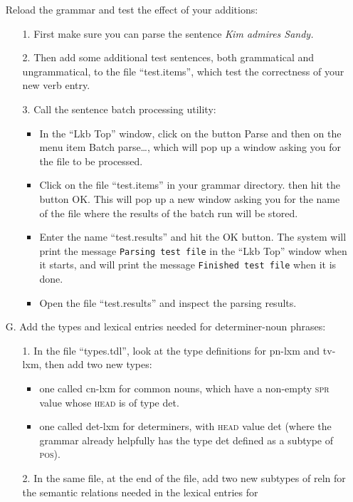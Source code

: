 \documentclass[10pt]{article}
\begin{document}
\begin{itemize}
 Reload the grammar and test the effect of your additions:
\begin{itemize}
\item[1.] First make sure you can parse the sentence \emph{Kim admires Sandy.}
\item[2.] Then add some additional test sentences, both grammatical and 
ungrammatical, to the file ``test.items'', which test the correctness of your
new verb entry.
\item[3.] Call the sentence batch processing utility:
\begin{itemize}
\item In the ``Lkb Top'' window, click on the button \textsf{Parse} and
then on the menu item \textsf{Batch parse\ldots}, which will pop up a window
asking you for the file to be processed.
\item Click on the file ``test.items'' in your grammar directory. then hit
the button \textsf{OK}.  This will pop up a new window asking you for the name
of the file where the results of the batch run will be stored.
\item Enter the name ``test.results'' and hit the \textsf{OK} button.
The system will print the message \texttt{Parsing test file} in the ``Lkb
Top'' window when it starts, and will print the message \texttt{Finished test
file} when it is done.
\item Open the file ``test.results'' and inspect the parsing results.
\end{itemize}
\end{itemize}
\item[G.] Add the types and lexical entries needed for determiner-noun phrases:
\begin{itemize}
\item[1.] In the file ``types.tdl'', look at the type definitions for \textsf{pn-lxm} and \textsf{tv-lxm}, then add two new types: 
\begin{itemize}
\item one called \textsf{cn-lxm} for common nouns, which have a
 non-empty \textsc{spr} value whose \textsc{head} is of type
\textsf{det}.
\item one called \textsf{det-lxm} for determiners, with \textsc{head} value \textsf{det} (where the grammar already helpfully has the type \textsf{det}
defined as a subtype of \textsc{pos}).
\end{itemize}
\item[2.] In the same file, at the end of the file, add two new subtypes of
\textsf{reln} for the semantic relations needed in the lexical entries for 

\end{itemize}
\end{itemize}
\end{document}
